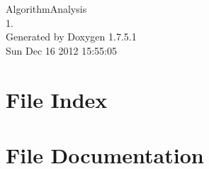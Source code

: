 \documentclass[a4paper]{book}
\begin{document}
\begin{titlepage}
\vspace*{7cm}
\begin{center}
{\Large \-Algorithm\-Analysis \\[1ex]\large 1. }\\
\vspace*{1cm}
{\large \-Generated by Doxygen 1.7.5.1}\\
\vspace*{0.5cm}
{\small Sun Dec 16 2012 15:55:05}\\
\end{center}
\end{titlepage}
\clearemptydoublepage
{}
\tableofcontents
\clearemptydoublepage
{}
\chapter{\-File \-Index}

\chapter{\-File \-Documentation}











\printindex
\end{document}
